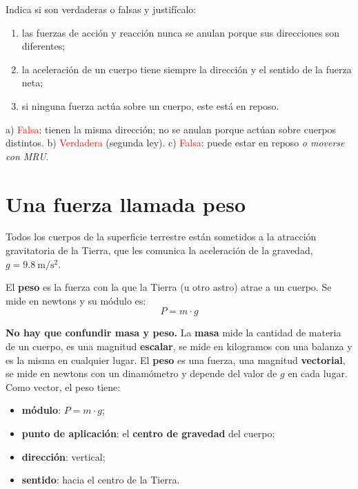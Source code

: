 \begin{exercise}
    Indica si son verdaderas o falsas y justifícalo:
    \begin{enumerate}[label=\alph*)]
        \item las fuerzas de acción y reacción nunca se anulan porque sus direcciones son diferentes;
        \item la aceleración de un cuerpo tiene siempre la dirección y el sentido de la fuerza neta;
        \item si ninguna fuerza actúa sobre un cuerpo, este está en reposo.
    \end{enumerate}
    \begin{solu}
        a) \textcolor{red}{Falsa}: tienen la misma dirección; no se anulan porque actúan sobre cuerpos distintos. b) \textcolor{red}{Verdadera} (segunda ley). c) \textcolor{red}{Falsa}: puede estar en reposo \emph{o moverse con MRU}.
    \end{solu}
\end{exercise}

\section{Una fuerza llamada peso}

Todos los cuerpos de la superficie terrestre están sometidos a la atracción gravitatoria de la Tierra, que les comunica la aceleración de la gravedad, \(g = \qty{9.8}{\m\per\square\s}\).

\begin{definition}[Peso]
    El \textbf{peso} es la fuerza con la que la Tierra (u otro astro) atrae a un cuerpo. Se mide en newtons y su módulo es:
    \[ P = m \cdot g \]
\end{definition}

\textbf{No hay que confundir masa y peso.} La \textbf{masa} mide la cantidad de materia de un cuerpo, es una magnitud \textbf{escalar}, se mide en kilogramos con una balanza y es la misma en cualquier lugar. El \textbf{peso} es una fuerza, una magnitud \textbf{vectorial}, se mide en newtons con un dinamómetro y depende del valor de \(g\) en cada lugar. Como vector, el peso tiene:
\begin{itemize}
    \item \textbf{módulo}: \(P = m \cdot g\);
    \item \textbf{punto de aplicación}: el \textbf{centro de gravedad} del cuerpo;
    \item \textbf{dirección}: vertical;
    \item \textbf{sentido}: hacia el centro de la Tierra.
\end{itemize}

